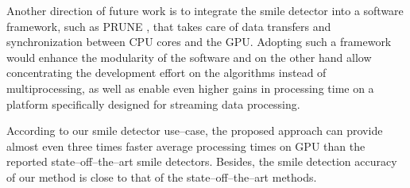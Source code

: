 \documentclass[conference]{IEEEtran}
\begin{document}
Another direction of future work is to integrate the smile detector into a software framework, such as PRUNE \cite{prune}, that takes care of data transfers and synchronization between CPU cores and the GPU. Adopting such a framework would enhance the modularity of the software and on the other hand allow concentrating the development effort on the algorithms instead of multiprocessing, as well as enable even higher gains in processing time on a platform specifically designed for streaming data processing.

\begin{table}
 \centering
{}\label{tab:comparison}
\begin{minipage}{0.4\textwidth}
\end{minipage}
\end{table}


According to our smile detector use--case, the proposed approach can provide almost even three times faster average processing times on GPU than the reported state--off--the--art smile detectors. Besides, the smile detection accuracy of our method is close to that of the state--off--the--art methods.
\end{document}
